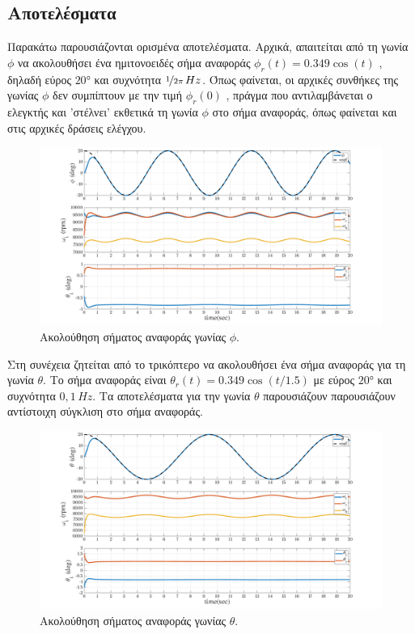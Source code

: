 \subsection{Αποτελέσματα}
Παρακάτω παρουσιάζονται ορισμένα αποτελέσματα. Αρχικά, απαιτείται από τη γωνία 
$\phi$ να ακολουθήσει ένα ημιτονοειδές σήμα αναφοράς $\phi_r(t) = 0.349\cos(t)$ 
, δηλαδή εύρος $\ang{20}$ και συχνότητα $\nicefrac{1}{2\pi}\,Hz$. Όπως φαίνεται, 
οι αρχικές συνθήκες της γωνίας $\phi$ δεν συμπίπτουν με την τιμή $\phi_r(0)$ 
, πράγμα που αντιλαμβάνεται ο ελεγκτής και 'στέλνει' εκθετικά τη γωνία $\phi$ 
στο σήμα αναφοράς, όπως φαίνεται και στις αρχικές δράσεις ελέγχου.
\begin{figure}[H]
    \centering
    \includegraphics[width=1\textwidth]{Control/Nominal/fig_roll.png}
    \caption{Ακολούθηση σήματος αναφοράς γωνίας $\phi$.}\label{fig:roll}
\end{figure}

Στη συνέχεια ζητείται από το τρικόπτερο να ακολουθήσει ένα σήμα αναφοράς για τη 
γωνία $\theta$. Το σήμα αναφοράς είναι $\theta_r(t) = 0.349\cos(t/1.5)$ με 
εύρος $\ang{20}$ και συχνότητα $0,1\,Hz$. Τα αποτελέσματα για την γωνία 
$\theta$ παρουσιάζουν παρουσιάζουν αντίστοιχη σύγκλιση στο σήμα αναφοράς. 
\begin{figure}[H]
    \centering
    \includegraphics[width=1\textwidth]{Control/Nominal/fig_pitch.png}
    \caption{Ακολούθηση σήματος αναφοράς γωνίας $\theta$.}\label{fig:pitch}
\end{figure}

